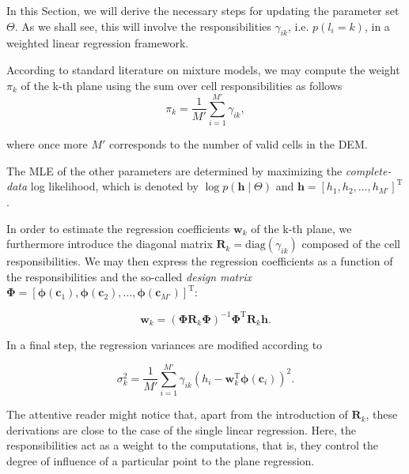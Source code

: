 In this Section, we will derive the necessary steps for updating the parameter
set $\Theta$. As we shall see, this will involve the responsibilities
$\gamma_{ik}$, i.e. $p(l_i=k)$, in a weighted linear regression framework.

According to standard literature on mixture models, we may compute the weight
$\pi_k$ of the k-th plane using the sum over cell responsibilities as follows
\begin{equation}
\label{eqn:weights}
\pi_k = \frac{1}{M'}\sum_{i=1}^{M'}\gamma_{ik},
\end{equation}

where once more $M'$ corresponds to the number of valid cells in the DEM.

The MLE of the other parameters are determined by maximizing the
\emph{complete-data} log likelihood, which is denoted by
$\log p(\mathbf{h}\mid\Theta)$ and $\mathbf{h}=[h_1,h_2,\dots,h_{M'}]^\text{T}$.

In order to estimate the regression coefficients $\mathbf{w}_k$ of the k-th
plane, we furthermore introduce the diagonal matrix
$\mathbf{R}_k=\text{diag}(\gamma_{ik})$ composed of the cell responsibilities.
We may then express the regression coefficients as a function of the
responsibilities and the so-called \emph{design matrix} $\boldsymbol{\Phi}=
[\boldsymbol{\phi}(\mathbf{c}_1), \boldsymbol{\phi}
(\mathbf{c}_2),\dots,\boldsymbol{\phi}(\mathbf{c}_{M'})]^\text{T}$:

\begin{equation}
\label{eqn:coeff}
\mathbf{w}_k = (\boldsymbol{\Phi}\mathbf{R}_k\boldsymbol{\Phi})^{-1}
\boldsymbol{\Phi}^\text{T}\mathbf{R}_k\mathbf{h}.
\end{equation}

In a final step, the regression variances are modified according to

\begin{equation}
\label{eqn:coeff}
\sigma^2_k = \frac{1}{M'}\sum_{i=1}^{M'} \gamma_{ik}(h_i-\mathbf{w}_k^\text{T}
\boldsymbol{\phi}(\mathbf{c}_i))^2.
\end{equation}

The attentive reader might notice that, apart from the introduction of
$\mathbf{R}_k$, these derivations are close to the case of the single linear
regression. Here, the responsibilities act as a weight to the computations, that
is, they control the degree of influence of a particular point to the
plane regression.
